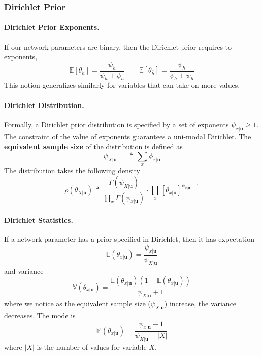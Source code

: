 \documentclass[11pt]{article}
\newcommand{\bu}{\mathbf{u}}
\begin{document}
\subsubsection{Dirichlet Prior}
\paragraph{Dirichlet Prior Exponents.}
If our network parameters are binary, then the Dirichlet prior requires to exponents, 
\begin{equation}
	\mathbb E [ \theta_h ] = \frac{\psi_h}{\psi_h + \psi_{\overbar h}} \quad \quad 
	\mathbb E [ \theta_{\overbar h} ] = \frac{\psi_{\overbar h}}{\psi_h + \psi_{\overbar h}}
\end{equation}
This notion generalizes similarly for variables that can take on more values. 

\paragraph{Dirichlet Distribution.} Formally, a Dirichlet prior distribution is specified by a set of exponents $\psi_{x | \bu} \geq 1$. The constraint of the value of exponents guarantees a uni-modal Dirichlet. The \textbf{equivalent sample size} of the distribution is defined as 
\begin{equation}
	\psi_{X | \bu}  = \triangleq \sum_ x \phi_{x | \bu}
\end{equation}
The distribution takes the following density
\begin{equation}
	\rho ( \theta _ { X | \bu } ) \triangleq \frac{\Gamma (\psi _ {X | \bu} )}{\prod _ x \Gamma (\psi _ {x | \bu}) } \cdot  \prod_x \left[ \theta _ {x | \bu} \right] ^{\psi_{x | \bu} - 1}
\end{equation}

\paragraph{Dirichlet Statistics.}
If a network parameter has a prior specified in Dirichlet, then it has expectation
\begin{equation}
	\mathbb E ( \theta _{x | \bu} ) = \frac{\psi _ {x | \bu}}{\psi _ {X | \bu}}
\end{equation}
and variance 
\begin{equation}
	\mathbb V (\theta _{x | \bu} ) = \frac{\mathbb E ( \theta _{x | \bu} ) ( 1- \mathbb E ( \theta _{x | \bu} ))}{\psi_{X | \bu } + 1}
\end{equation}
where we notice as the equivalent sample size ($\psi_{X | \bu }$) increase, the variance decreases. The mode is 
\begin{equation}
	\mathbb M ( \theta _{x | \bu} ) = \frac{\psi_{x | \bu} - 1}{\psi _{X | \bu} - |X|}
\end{equation}
where $|X|$ is the number of values for variable $X$. 
\end{document}
